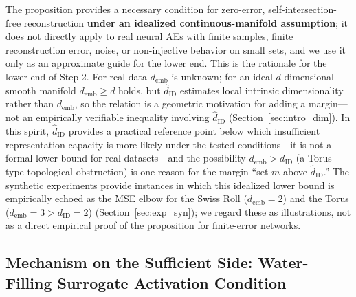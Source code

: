 \documentclass[make,article,submit,pdftex,moreauthors]{Definitions/mdpi}
\newcommand{\dID}{d_{\mathrm{ID}}}
\newcommand{\hatdID}{\hat{d}_{\mathrm{ID}}}
\newcommand{\demb}{d_{\mathrm{emb}}}
\begin{document}
The proposition provides a necessary condition for zero-error,
self-intersection-free reconstruction \textbf{under an idealized
continuous-manifold assumption}; it does not directly apply to real neural
AEs with finite samples, finite reconstruction error, noise, or
non-injective behavior on small sets, and we use it only as an approximate
guide for the lower end.
This is the rationale for the lower end of Step 2.
For real data $\demb$ is unknown; for an ideal $d$-dimensional smooth
manifold $\demb \geq d$ holds, but $\hatdID$ estimates local intrinsic
dimensionality rather than $\demb$, so the relation is a geometric
motivation for adding a margin---not an empirically verifiable inequality
involving $\hatdID$ (Section~\ref{sec:intro_dim}).
In this spirit, $\hatdID$ provides a practical reference point below which
insufficient representation capacity is more likely under the tested
conditions---it is not a formal lower bound for real datasets---and the
possibility $\demb > \dID$ (a
Torus-type topological obstruction) is one reason for the margin ``set $m$
above $\hatdID$.''
The synthetic experiments provide instances in which this idealized lower
bound is empirically echoed as the MSE elbow for the Swiss Roll
($\demb = 2$) and the Torus ($\demb = 3 > \dID = 2$)
(Section~\ref{sec:exp_syn}); we regard these as illustrations, not as a
direct empirical proof of the proposition for finite-error networks.

\subsection{Mechanism on the Sufficient Side: Water-Filling Surrogate Activation Condition}\label{sec:theory_wf}
\end{document}
